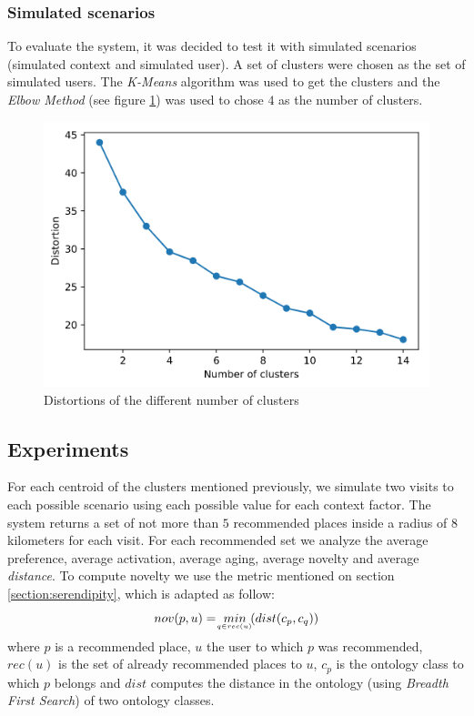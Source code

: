 \subsubsection{Simulated scenarios}
To evaluate the system, it was decided to test it with simulated scenarios (simulated context and simulated user). A set of clusters were chosen as the set of simulated users. The \textit{K-Means} algorithm was used to get the clusters and the \textit{Elbow Method} (see figure \ref{fig:elbow}) was used to chose $4$ as the number of clusters.
\begin{figure}[h]
    \centering
    \includegraphics[scale=0.45]{elbow.png}
    \caption{Distortions of the different number of clusters}
    \label{fig:elbow}
\end{figure}

\subsection{Experiments}
For each centroid of the clusters mentioned previously, we simulate two visits to each possible scenario using each possible value for each context factor. The system returns a set of not more than $5$ recommended places inside a radius of $8$ kilometers for each visit. For each recommended set we analyze the average preference, average activation, average aging, average novelty \cite{kotkov2016survey} and average \textit{distance}. To compute novelty we use the metric mentioned on section \ref{section:serendipity}, which is adapted as follow:
\begin{equation} \label{eq:novelty}
    nov(p, u) = \  \underaccent{q \in rec(u)}{min} \  ( dist( c_p, c_q ) )
\end{equation}
where $p$ is a recommended place, $u$ the user to which $p$ was recommended, $rec(u)$ is the set of already recommended places to $u$, $c_p$ is the ontology class to which $p$ belongs and $dist$ computes the distance in the ontology (using \textit{Breadth First Search}) of two ontology classes.